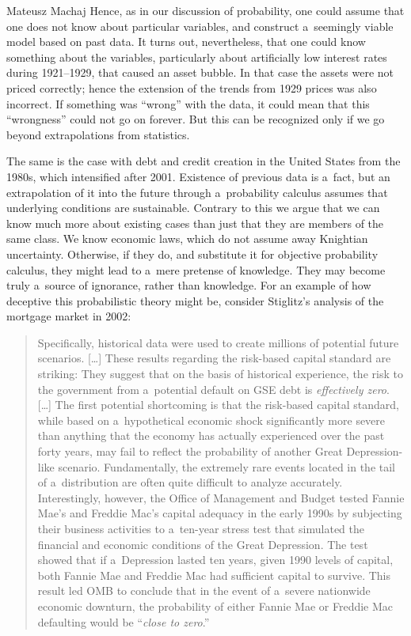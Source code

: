 \begin{artengenv}{Mateusz Machaj}
Hence, as in our discussion of probability, one could assume that one does not know about particular variables, and construct a~seemingly viable model based on past data. It turns out, nevertheless, that one could know something about the variables, particularly about artificially low interest rates during 1921–1929, that caused an asset bubble. In that case the assets were not priced correctly; hence the extension of the trends from 1929 prices was also incorrect. If something was ``wrong'' with the data, it could mean that this ``wrongness'' could not go on forever. But this can be recognized only if we go beyond extrapolations from statistics.



The same is the case with debt and credit creation in the United States from the 1980s, which intensified after 2001. Existence of previous data is a~fact, but an extrapolation of it into the future through a~probability calculus assumes that underlying conditions are sustainable. Contrary to this we argue that we can know much more about existing cases than just that they are members of the same class. We know economic laws, which do not assume away Knightian uncertainty. Otherwise, if they do, and substitute it for objective probability calculus, they might lead to a~mere pretense of knowledge. They may become truly a~source of ignorance, rather than knowledge. For an example of how deceptive this probabilistic theory might be, consider Stiglitz's analysis of the mortgage market in 2002:



\begin{quote}
Specifically, historical data were used to create millions of potential future scenarios. […] These results regarding the risk-based capital standard are striking: They suggest that on the basis of historical experience, the risk to the government from a~potential default on GSE debt is \textit{effectively zero}. […] The first potential shortcoming is that the risk-based capital standard, while based on a~hypothetical economic shock significantly more severe than anything that the economy has actually experienced over the past forty years, may fail to reflect the probability of another Great Depression-like scenario. Fundamentally, the extremely rare events located in the tail of a~distribution are often quite difficult to analyze accurately. Interestingly, however, the Office of Management and Budget tested Fannie Mae's and Freddie Mac's capital adequacy in the early 1990s by subjecting their business activities to a~ten-year stress test that simulated the financial and economic conditions of the Great Depression. The test showed that if a~Depression lasted ten years, given 1990 levels of capital, both Fannie Mae and Freddie Mac had sufficient capital to survive. This result led OMB to conclude that in the event of a~severe nationwide economic downturn, the probability of either Fannie Mae or Freddie Mac defaulting would be ``\textit{close to zero}.'' 
\parencite[][p.5, emphasis added]{stiglitz_implications_2002}%
\end{quote}





\end{artengenv}
